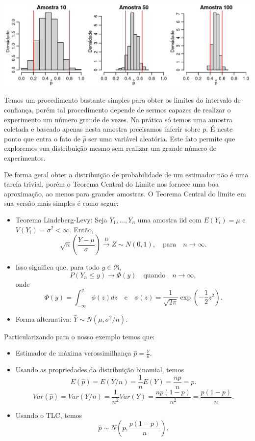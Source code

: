 \documentclass[
  10pt,
  a4paper]{book}
\providecommand{\tightlist}{%
  \setlength{\itemsep}{0pt}\setlength{\parskip}{0pt}}
\begin{document}
\begin{center}\includegraphics[width=0.99\linewidth]{figures/unnamed-chunk-384-1} \end{center}

Temos um procedimento bastante simples para obter os limites do intervalo de confiança, porém tal procedimento depende de sermos capazes de realizar o experimento um número grande de vezes. Na prática só temos uma amostra coletada e baseado apenas nesta amostra precisamos inferir sobre \(p\). É neste ponto que entra o fato de \(\hat{p}\) ser uma variável aleatória. Este fato permite que exploremos sua distribuição mesmo sem realizar um grande número de experimentos.

De forma geral obter a distribuição de probabilidade de um estimador não é uma tarefa trivial, porém o Teorema Central do Limite nos fornece uma boa aproximação, ao menos para grandes amostras. O Teorema Central do limite em sua versão mais simples é como segue:

\begin{itemize}
\tightlist
\item
  Teorema Lindeberg-Levy: Seja \(Y_1, \ldots, Y_n\) uma amostra iid
  com \(E(Y_i) = \mu\) e \(V(Y_i) = \sigma^2 < \infty\).
  Então,
  \[ \sqrt{n}\left ( \frac{\bar{Y} - \mu}{\sigma} \right ) \overset{D}{\to} Z \sim N(0,1), \quad \text{para} \quad n \to \infty.\]
\item
  Isso significa que, para todo \(y \in \Re\),
  \[ P(Y_n \leq y) \to \Phi (y) \quad \text{quando} \quad n \to \infty,\] onde
  \[ \Phi(y) = \int_{-\infty}^y \phi(z) dz \quad \text{e} \quad 
  \phi(z) = \frac{1}{\sqrt{2\pi}} \exp \left ( -\frac{1}{2} z^2 \right ).\]
\item
  Forma alternativa: \(\bar{Y} \sim N(\mu, \sigma^2/n).\)
\end{itemize}

Particularizando para o nosso exemplo temos que:

\begin{itemize}
\tightlist
\item
  Estimador de máxima verossimilhança \(\hat{p} = \frac{Y}{n}.\)
\item
  Usando as propriedades da distribuição binomial, temos
  \[E(\hat{p}) = E(Y/n) = \frac{1}{n}E(Y) = \frac{np}{n} = p.\]
  \[Var(\hat{p}) = Var(Y/n) = \frac{1}{n^2}Var(Y) = \frac{np(1-p)}{n^2} = \frac{p(1-p)}{n}.\]
\item
  Usando o TLC, temos
  \[\hat{p} \sim N(p, \frac{p(1-p)}{n}).\]
\end{itemize}
\end{document}
